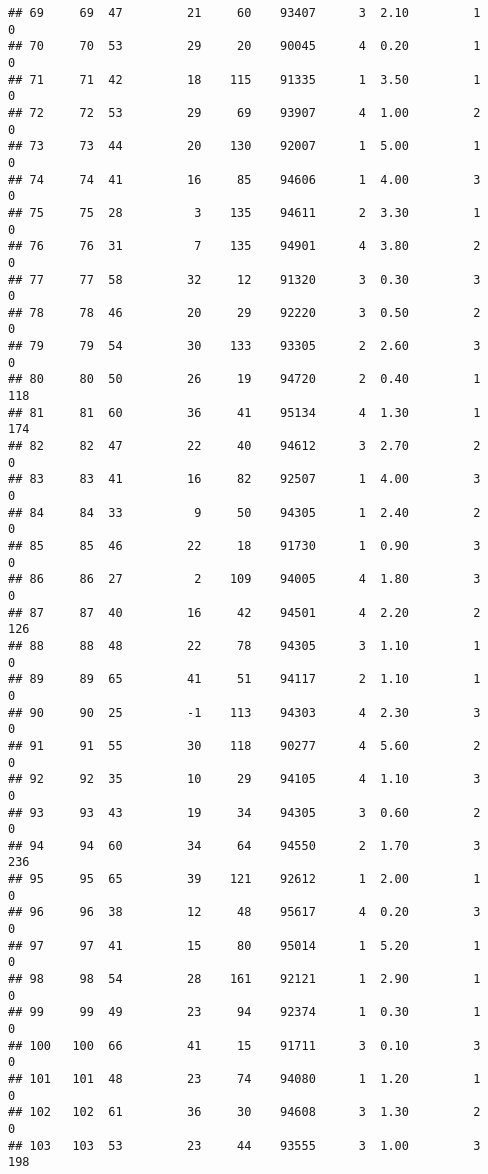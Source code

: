 \documentclass[
]{article}
\begin{document}
\begin{verbatim}
## 69     69  47         21     60    93407      3  2.10         1        0
## 70     70  53         29     20    90045      4  0.20         1        0
## 71     71  42         18    115    91335      1  3.50         1        0
## 72     72  53         29     69    93907      4  1.00         2        0
## 73     73  44         20    130    92007      1  5.00         1        0
## 74     74  41         16     85    94606      1  4.00         3        0
## 75     75  28          3    135    94611      2  3.30         1        0
## 76     76  31          7    135    94901      4  3.80         2        0
## 77     77  58         32     12    91320      3  0.30         3        0
## 78     78  46         20     29    92220      3  0.50         2        0
## 79     79  54         30    133    93305      2  2.60         3        0
## 80     80  50         26     19    94720      2  0.40         1      118
## 81     81  60         36     41    95134      4  1.30         1      174
## 82     82  47         22     40    94612      3  2.70         2        0
## 83     83  41         16     82    92507      1  4.00         3        0
## 84     84  33          9     50    94305      1  2.40         2        0
## 85     85  46         22     18    91730      1  0.90         3        0
## 86     86  27          2    109    94005      4  1.80         3        0
## 87     87  40         16     42    94501      4  2.20         2      126
## 88     88  48         22     78    94305      3  1.10         1        0
## 89     89  65         41     51    94117      2  1.10         1        0
## 90     90  25         -1    113    94303      4  2.30         3        0
## 91     91  55         30    118    90277      4  5.60         2        0
## 92     92  35         10     29    94105      4  1.10         3        0
## 93     93  43         19     34    94305      3  0.60         2        0
## 94     94  60         34     64    94550      2  1.70         3      236
## 95     95  65         39    121    92612      1  2.00         1        0
## 96     96  38         12     48    95617      4  0.20         3        0
## 97     97  41         15     80    95014      1  5.20         1        0
## 98     98  54         28    161    92121      1  2.90         1        0
## 99     99  49         23     94    92374      1  0.30         1        0
## 100   100  66         41     15    91711      3  0.10         3        0
## 101   101  48         23     74    94080      1  1.20         1        0
## 102   102  61         36     30    94608      3  1.30         2        0
## 103   103  53         23     44    93555      3  1.00         3      198

\end{verbatim}
\end{document}
